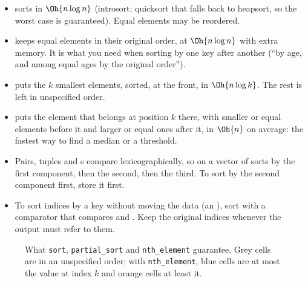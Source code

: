 \begin{itemize}
  \item {} sorts in $\Oh{n \log n}$ (introsort: quicksort that falls back to heapsort, so the worst case is
        guaranteed). Equal elements may be reordered.
  \item {} keeps equal elements in their original order, at $\Oh{n\log n}$ with extra memory. It is what you
        need when sorting by one key after another (``by age, and among equal ages by the original order'').
  \item {} puts the $k$ smallest elements, sorted, at the front, in
        $\Oh{n\log k}$. The rest is left in unspecified order.
  \item {} puts the element that belongs at position $k$ there, with smaller
        or equal elements before it and larger or equal ones after it, in $\Oh{n}$ on average: the fastest way to find a
        median or a threshold.
  \item Pairs, tuples and s compare lexicographically, so  on a vector of  sorts
        by the first component, then the second, then the third. To sort by the second component first, store it first.
  \item To sort indices by a key without moving the data (an ), sort  with a comparator
        that compares  and . Keep the original indices whenever the output must refer to them.
\end{itemize}

\begin{figure}[htbp]
\centering
{}
\caption{What \texttt{sort}, \texttt{partial\_sort} and \texttt{nth\_element} guarantee. Grey cells are in an unspecified
order; with \texttt{nth\_element}, blue cells are at most the value at index $k$ and orange cells at least it.}
\label{fig:sortfamily}
\end{figure}


